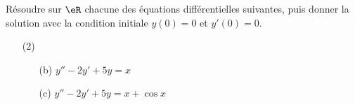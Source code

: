 
\begin{exercice}\label{exoautoanalyseCTU-37devoir}


Résoudre sur $\eR$ chacune des équations différentielles suivantes, puis donner la solution avec la condition initiale $y(0)=0$ et $y'(0)=0$.
\begin{enumerate}
\item[(2)] \begin{enumerate}
\item[(b)] $y''-2y'+5y=x$
\item[(c)] $y''-2y'+5y=x+\cos x$
\end{enumerate}
 \end{enumerate}





\end{exercice}
